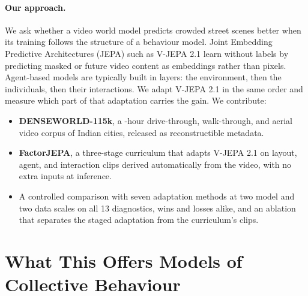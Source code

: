 \documentclass[letterpaper]{article} %
\begin{document}
\paragraph{Our approach.} We ask whether a video world model predicts crowded street scenes better when its training follows the structure of a behaviour model. Joint Embedding Predictive Architectures (JEPA) such as V-JEPA 2.1 \cite{murlabadia2026vjepa21} learn without labels by predicting masked or future video content as embeddings rather than pixels. Agent-based models are typically built in layers: the environment, then the individuals, then their interactions. We adapt V-JEPA 2.1 in the same order and measure which part of that adaptation carries the gain. We contribute:
\begin{itemize}
    \item \textbf{DENSEWORLD-115k}, a \nHours{}-hour drive-through, walk-through, and aerial video corpus of \nCities{} Indian cities, released as reconstructible metadata.
    \item \textbf{FactorJEPA}, a three-stage curriculum that adapts V-JEPA 2.1 on layout, agent, and interaction clips derived automatically from the video, with no extra inputs at inference.
    \item A controlled comparison with seven adaptation methods at two model and two data scales on all 13 diagnostics, wins and losses alike, and an ablation that separates the staged adaptation from the curriculum's clips.
\end{itemize}









\section{What This Offers Models of Collective Behaviour}
\end{document}

